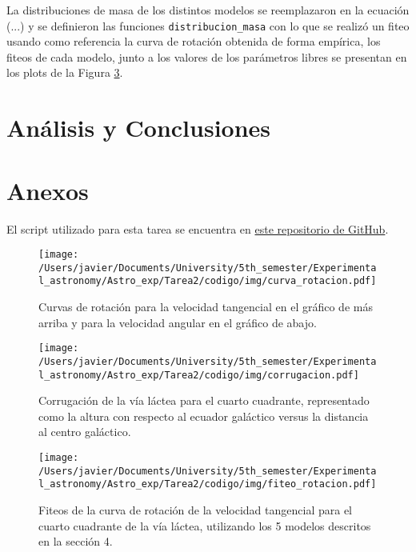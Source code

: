 \documentclass[letterpaper,oneside]{article}
\begin{document}
La distribuciones de masa de los distintos modelos se reemplazaron en la ecuación (...) y se definieron las funciones \texttt{distribucion\_masa} con lo que se realizó un fiteo usando como referencia la curva de rotación obtenida de forma empírica, los fiteos de cada modelo, junto a los valores de los parámetros libres se presentan en los plots de la Figura \ref{fig:fit-curva-rotacion}.
\section{Análisis y Conclusiones}

\section{Anexos}
El script utilizado para esta tarea se encuentra en \href{https://github.com/Wenupi/Astro_exp}{este repositorio de GitHub}.

\begin{figure}[H]
    \centering
    \texttt{[image: /Users/javier/Documents/University/5th\_semester/Experimental\_astronomy/Astro\_exp/Tarea2/codigo/img/curva\_rotacion.pdf]}
    \caption{Curvas de rotación para la velocidad tangencial en el gráfico de más arriba y para la velocidad angular en el gráfico de abajo.}
    \label{fig:curva-rotacion}
\end{figure}

\begin{figure}[H]
    \centering
    \texttt{[image: /Users/javier/Documents/University/5th\_semester/Experimental\_astronomy/Astro\_exp/Tarea2/codigo/img/corrugacion.pdf]}
    \caption{Corrugación de la vía láctea para el cuarto cuadrante, representado como la altura con respecto al ecuador galáctico versus la distancia al centro galáctico.}
    \label{fig:corrugacion}
\end{figure}

\begin{figure}[H]
    \centering
    \texttt{[image: /Users/javier/Documents/University/5th\_semester/Experimental\_astronomy/Astro\_exp/Tarea2/codigo/img/fiteo\_rotacion.pdf]}
    \caption{Fiteos de la curva de rotación de la velocidad tangencial para el cuarto cuadrante de la vía láctea, utilizando los 5 modelos descritos en la sección 4.}
    \label{fig:fit-curva-rotacion}
\end{figure}



\end{document}
